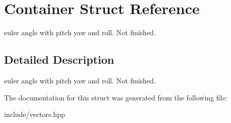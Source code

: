 \hypertarget{struct_container}{\section{Container Struct Reference}
\label{struct_container}
}


euler angle with pitch yaw and roll. Not finished.  




\subsection{Detailed Description}
euler angle with pitch yaw and roll. Not finished. 

The documentation for this struct was generated from the following file\-:\begin{DoxyCompactItemize}
\item 
include/vectors.\-hpp\end{DoxyCompactItemize}
